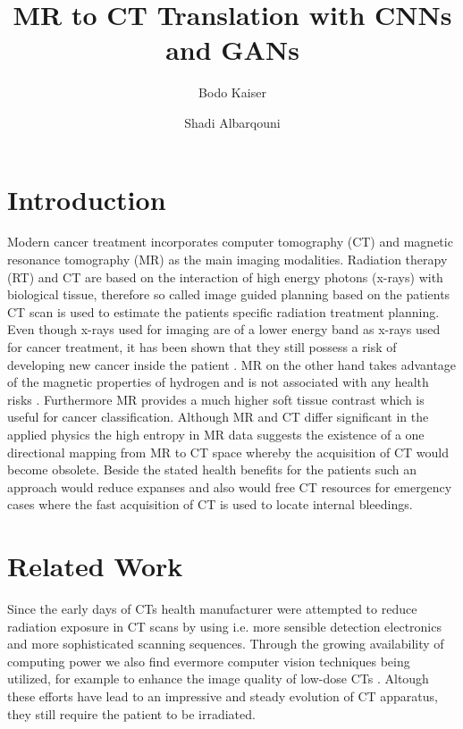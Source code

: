 \documentclass[
  a4paper,
  abstracton,
  emulatestandardclasses,
]{scrartcl}
\title{MR to CT Translation with CNNs and GANs}
\author[1]{Bodo Kaiser}
\author[2]{Shadi Albarqouni}
\affil[1]{Ludwig-Maximilians-Universität München}
\affil[2]{Technische Universität München}
\begin{document}
\maketitle

\begin{abstract}
\end{abstract}

\section{Introduction}

Modern cancer treatment incorporates computer tomography (CT) and magnetic
resonance tomography (MR) as the main imaging modalities. Radiation therapy
(RT) and CT are based on the interaction of high energy photons (x-rays) with
biological tissue, therefore so called image guided planning based on the
patients CT scan is used to estimate the patients specific radiation treatment
planning. Even though x-rays used for imaging are of a lower energy band
as x-rays used for cancer treatment, it has been shown that they still possess
a risk of developing new cancer inside the patient \cite{Martin06}.
MR on the other hand takes advantage of the magnetic properties of hydrogen
and is not associated with any health risks \cite{Hartwig09}. Furthermore MR
provides a much higher soft tissue contrast which is useful for cancer
classification. Although MR and CT differ significant in the applied
physics the high entropy in MR data suggests the existence of a one
directional mapping from MR to CT space whereby the acquisition of CT would
become obsolete. Beside the stated health benefits for the patients such an
approach would reduce expanses and also would free CT resources for
emergency cases where the fast acquisition of CT is used to locate internal
bleedings.

\section{Related Work}

Since the early days of CTs health manufacturer were attempted to reduce
radiation exposure in CT scans by using i.e. more sensible detection
electronics and more sophisticated scanning sequences. Through the growing
availability of computing power we also find evermore computer vision
techniques being utilized, for example to enhance the image quality of
low-dose CTs \cite{Xu12}. Altough these efforts have lead to an
impressive and steady evolution of CT apparatus, they still require the
patient to be irradiated.
\end{document}
